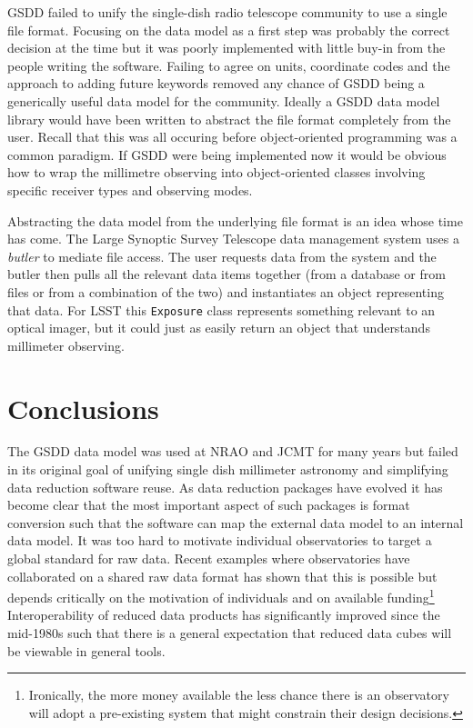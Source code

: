 \documentclass[final,authoryear,5p,times,twocolumn]{elsarticle}
\begin{document}
GSDD failed to unify the single-dish radio telescope community to use
a single file format. Focusing on the data model as a first step was
probably the correct decision at the time but it was poorly
implemented with little buy-in from the people writing the
software. Failing to agree on units, coordinate codes and the approach
to adding future keywords removed any chance of GSDD being a
generically useful data model for the community.
Ideally a GSDD data model library would have been written to
abstract the file format completely from the user. Recall that this was
all occuring before object-oriented programming was a common
paradigm. If GSDD were being implemented now it would be obvious how
to wrap the millimetre observing into object-oriented classes
involving specific receiver types and observing modes.

Abstracting the data model from the underlying file format is an idea
whose time has come. The Large Synoptic Survey Telescope data
management system \citep{2008arXiv0805.2366I,2010SPIE.7740E..1NK} uses
a \emph{butler} to mediate file access. The user requests data from
the system and the butler then pulls all the relevant data items
together (from a database or from files or from a combination of the
two) and instantiates an object representing that data. For LSST this
\texttt{Exposure} class represents something relevant to an optical
imager, but it could just as easily return an object that understands
millimeter observing.

\section{Conclusions}

The GSDD data model was used at NRAO and JCMT for many years
but failed in its original goal of unifying single dish millimeter
astronomy and simplifying data reduction software reuse. As data
reduction packages have evolved it has become clear that the most
important aspect of such packages is format conversion such that the
software can map the external data model to an internal data model. It
was too hard to motivate individual observatories to target a
global standard for raw data. Recent examples where observatories have
collaborated on a shared raw data format
\citep[e.g. MBFITS;][]{2006A&A...454L..25M} has shown that this is
possible but depends critically on the motivation of individuals and
on available funding\footnote{Ironically, the more money available the
  less chance there is an observatory will adopt a pre-existing system
  that might constrain their design decisions.}
 Interoperability of reduced data
products has significantly improved since the mid-1980s such that
there is a general expectation that reduced data cubes will be
viewable in general tools.
\end{document}
